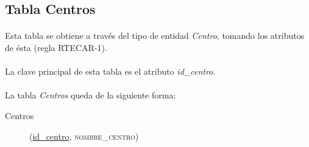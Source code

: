    \subsection{Tabla Centros}

      \paragraph{}Esta tabla se obtiene a través del tipo de entidad
      \textit{Centro}, tomando los atributos de ésta (regla RTECAR-1).

      \paragraph{}La clave principal de esta tabla es el atributo
      \textit{id\_centro}.

      \paragraph{}La tabla \textit{Centros} queda de la siguiente forma:

      \begin{description}
         \item[Centros] \begin{flushleft}(\underline{id\_centro},
         \textsc{nombre\_centro})\end{flushleft}
      \end{description}